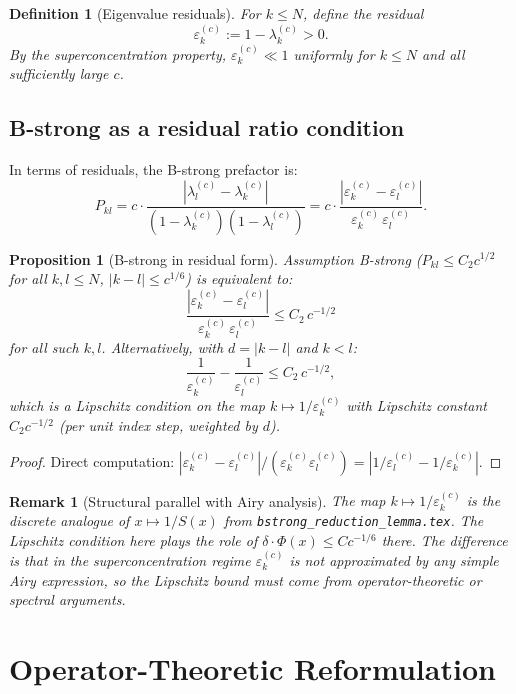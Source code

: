 \documentclass[12pt,a4paper]{article}
\newtheorem{proposition}[theorem]{Proposition}
\newtheorem{definition}[theorem]{Definition}
\newtheorem{remark}[theorem]{Remark}
\newcommand{\lam}[1]{\lambda_{#1}^{(c)}}
\newcommand{\eps}[1]{\varepsilon_{#1}^{(c)}}
\begin{document}
\begin{definition}[Eigenvalue residuals]
For $k \leq N$, define the \emph{residual}
\[
  \eps{k} := 1 - \lam{k} > 0.
\]
By the superconcentration property, $\eps{k} \ll 1$
uniformly for $k \leq N$ and all sufficiently large $c$.
\end{definition}

\subsection{B-strong as a residual ratio condition}

In terms of residuals, the B-strong prefactor is:
\[
  P_{kl} = c \cdot \frac{|\lam{l} - \lam{k}|}{(1-\lam{k})(1-\lam{l})}
  = c \cdot \frac{|\eps{k} - \eps{l}|}{\eps{k}\,\eps{l}}.
\]

\begin{proposition}[B-strong in residual form]
\label{prop:residual}
Assumption B-strong ($P_{kl} \leq C_2 c^{1/2}$ for all
$k,l \leq N$, $|k-l| \leq c^{1/6}$) is equivalent to:
\[
  \frac{|\eps{k} - \eps{l}|}{\eps{k}\,\eps{l}} \leq C_2\,c^{-1/2}
\]
for all such $k, l$.
Alternatively, with $d = |k - l|$ and $k < l$:
\[
  \frac{1}{\eps{k}} - \frac{1}{\eps{l}} \leq C_2\,c^{-1/2},
\]
which is a \emph{Lipschitz condition on the map
$k \mapsto 1/\eps{k}$} with Lipschitz constant $C_2 c^{-1/2}$
(per unit index step, weighted by $d$).
\end{proposition}

\begin{proof}
Direct computation:
$|\eps{k}-\eps{l}|/(\eps{k}\eps{l}) = |1/\eps{l} - 1/\eps{k}|$.
\end{proof}

\begin{remark}[Structural parallel with Airy analysis]
The map $k \mapsto 1/\eps{k}$ is the discrete analogue
of $x \mapsto 1/S(x)$ from \texttt{bstrong\_reduction\_lemma.tex}.
The Lipschitz condition here plays the role of
$\delta \cdot \Phi(x) \leq Cc^{-1/6}$ there.
The difference is that in the superconcentration regime
$\eps{k}$ is not approximated by any simple Airy expression,
so the Lipschitz bound must come from operator-theoretic
or spectral arguments.
\end{remark}

\section{Operator-Theoretic Reformulation}
\label{sec:operator}
\end{document}
